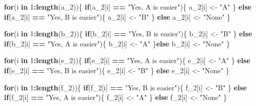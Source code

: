 \documentclass[
]{article}
\newenvironment{Shaded}{\begin{snugshade}}{\end{snugshade}}
\newcommand{\ControlFlowTok}[1]{\textcolor[rgb]{0.13,0.29,0.53}{\textbf{#1}}}
\newcommand{\DecValTok}[1]{\textcolor[rgb]{0.00,0.00,0.81}{#1}}
\newcommand{\KeywordTok}[1]{\textcolor[rgb]{0.13,0.29,0.53}{\textbf{#1}}}
\newcommand{\NormalTok}[1]{#1}
\newcommand{\OperatorTok}[1]{\textcolor[rgb]{0.81,0.36,0.00}{\textbf{#1}}}
\newcommand{\StringTok}[1]{\textcolor[rgb]{0.31,0.60,0.02}{#1}}
\begin{document}
\begin{Shaded}
\begin{Highlighting}[]
\ControlFlowTok{for}\NormalTok{(i }\ControlFlowTok{in} \DecValTok{1}\OperatorTok{:}\KeywordTok{length}\NormalTok{(a_}\DecValTok{2}\NormalTok{))\{}
  \ControlFlowTok{if}\NormalTok{(a_}\DecValTok{2}\NormalTok{[i] }\OperatorTok{==}\StringTok{ "Yes, A is easier"}\NormalTok{)\{}
\NormalTok{    a_}\DecValTok{2}\NormalTok{[i] <-}\StringTok{ "A"}
\NormalTok{  \} }\ControlFlowTok{else} \ControlFlowTok{if}\NormalTok{(a_}\DecValTok{2}\NormalTok{[i] }\OperatorTok{==}\StringTok{ "Yes, B is easier"}\NormalTok{)\{}
\NormalTok{  a_}\DecValTok{2}\NormalTok{[i] <-}\StringTok{ "B"}
\NormalTok{  \} }\ControlFlowTok{else}\NormalTok{ a_}\DecValTok{2}\NormalTok{[i] <-}\StringTok{ "None"}
\NormalTok{\}}

\ControlFlowTok{for}\NormalTok{(i }\ControlFlowTok{in} \DecValTok{1}\OperatorTok{:}\KeywordTok{length}\NormalTok{(b_}\DecValTok{2}\NormalTok{))\{}
  \ControlFlowTok{if}\NormalTok{(b_}\DecValTok{2}\NormalTok{[i] }\OperatorTok{==}\StringTok{ "Yes, B is easier"}\NormalTok{)\{}
\NormalTok{    b_}\DecValTok{2}\NormalTok{[i] <-}\StringTok{ "B"}
\NormalTok{  \} }\ControlFlowTok{else} \ControlFlowTok{if}\NormalTok{(b_}\DecValTok{2}\NormalTok{[i] }\OperatorTok{==}\StringTok{ "Yes, A is easier"}\NormalTok{)\{ }
\NormalTok{    b_}\DecValTok{2}\NormalTok{[i] <-}\StringTok{ "A"}
\NormalTok{    \}}\ControlFlowTok{else}\NormalTok{ b_}\DecValTok{2}\NormalTok{[i] <-}\StringTok{ "None"}
\NormalTok{\}}

\ControlFlowTok{for}\NormalTok{(i }\ControlFlowTok{in} \DecValTok{1}\OperatorTok{:}\KeywordTok{length}\NormalTok{(e_}\DecValTok{2}\NormalTok{))\{}
  \ControlFlowTok{if}\NormalTok{(e_}\DecValTok{2}\NormalTok{[i] }\OperatorTok{==}\StringTok{ "Yes, A is easier"}\NormalTok{)\{}
\NormalTok{    e_}\DecValTok{2}\NormalTok{[i] <-}\StringTok{ "A"}
\NormalTok{  \} }\ControlFlowTok{else} \ControlFlowTok{if}\NormalTok{(e_}\DecValTok{2}\NormalTok{[i] }\OperatorTok{==}\StringTok{ "Yes, B is easier"}\NormalTok{)\{}
\NormalTok{    e_}\DecValTok{2}\NormalTok{[i] <-}\StringTok{ "B"}
\NormalTok{  \} }\ControlFlowTok{else}\NormalTok{ e_}\DecValTok{2}\NormalTok{[i] <-}\StringTok{ "None"}
\NormalTok{\}}

\ControlFlowTok{for}\NormalTok{(i }\ControlFlowTok{in} \DecValTok{1}\OperatorTok{:}\KeywordTok{length}\NormalTok{(f_}\DecValTok{2}\NormalTok{))\{}
  \ControlFlowTok{if}\NormalTok{(f_}\DecValTok{2}\NormalTok{[i] }\OperatorTok{==}\StringTok{ "Yes, B is easier"}\NormalTok{)\{}
\NormalTok{    f_}\DecValTok{2}\NormalTok{[i] <-}\StringTok{ "B"}
\NormalTok{  \} }\ControlFlowTok{else} \ControlFlowTok{if}\NormalTok{(f_}\DecValTok{2}\NormalTok{[i] }\OperatorTok{==}\StringTok{ "Yes, A is easier"}\NormalTok{)\{}
\NormalTok{    f_}\DecValTok{2}\NormalTok{[i] <-}\StringTok{ "A"}
\NormalTok{  \} }\ControlFlowTok{else}\NormalTok{ f_}\DecValTok{2}\NormalTok{[i] <-}\StringTok{ "None"}
\NormalTok{\}}


\end{Highlighting}
\end{Shaded}
\end{document}
